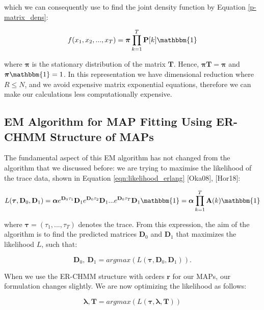 \documentclass[a4paper,11pt,titlepage]{article}
\begin{document}
which we can consequently use to find the joint density function by Equation \ref{p-matrix_dens}:

\begin{equation}
    f(x_1,x_2,...,x_T) = \bm{\pi} \prod_{k=1}^{T} \mathbf{P}[k] \mathbbm{1}
    \label{p-matrix_dens}
\end{equation}

where $\bm{\pi}$ is the stationary distribution of the matrix $\mathbf{T}$. Hence, $\bm{\pi} \mathbf{T} = \bm{\pi}$ and $\bm{\pi} \mathbbm{1} = 1$. In this representation we have dimensional reduction where $R \leq N$, and we avoid expensive matrix exponential equations, therefore we can make our calculations less computationally expensive. 

\subsection{EM Algorithm for MAP Fitting Using ER-CHMM Structure of MAPs}

The fundamental aspect of this EM algorithm has not changed from the algorithm that we discussed before: we are trying to maximise the likelihood of the trace data, shown in Equation \ref{eqn:likelihood_erlang} [Oka08], [Hor18]:

\begin{equation}
    L(\bm{\tau},\mathbf{D}_0, \mathbf{D}_1) = \bm{\alpha} e^{\mathbf{D}_0 \tau_1} \mathbf{D}_1 e^{\mathbf{D}_0 \tau_2} \mathbf{D}_1 ... e^{\mathbf{D}_0 \tau_T} \mathbf{D}_1 \mathbbm{1} = \bm{\alpha} \prod_{k=1}^T \mathbf{A}(k) \mathbbm{1}
    \label{eqn:likelihood_erlang}
\end{equation}

where $\bm{\tau} = (\tau_1,...,\tau_T)$ denotes the trace. From this expression, the aim of the algorithm is to find the predicted matrices $\mathbf{D}_0$ and $\mathbf{D}_1$ that maximizes the likelihood $L$, such that:

\begin{equation}
    \mathbf{D}_0, \: \mathbf{D}_1 = argmax(L(\bm{\tau}, \mathbf{D}_0, \mathbf{D}_1)).
\end{equation}

When we use the ER-CHMM structure with orders $\mathbf{r}$ for our MAPs, our formulation changes slightly. We are now optimizing the likelihood as follows: 

\begin{equation}
    \bm{\lambda}, \mathbf{T} = argmax (L(\bm{\tau}, \bm{\lambda}, \mathbf{T}))
\end{equation}
\end{document}
